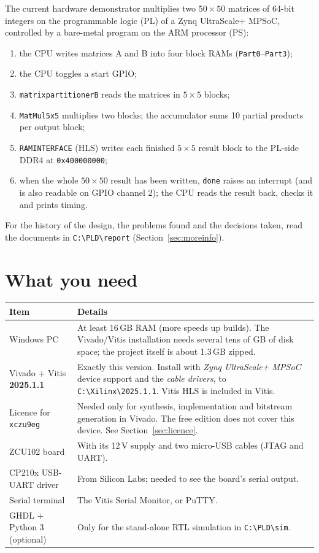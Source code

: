 \documentclass[11pt,a4paper]{article}
\newcommand{\code}[1]{\texttt{#1}}
\newcommand{\bs}{\textbackslash\allowbreak{}}
\renewcommand{\_}{\oldunderscore\allowbreak{}}
\newcommand{\pld}[1]{\code{C:\bs PLD\bs #1}}
\begin{document}
The current hardware demonstrator multiplies two $50\times50$ matrices of 64-bit integers on the programmable logic (PL) of a Zynq UltraScale+ MPSoC, controlled by a bare-metal program on the ARM processor (PS):
\begin{enumerate}[noitemsep]
  \item the CPU writes matrices A and B into four block RAMs (\code{Part0}--\code{Part3});
  \item the CPU toggles a start GPIO;
  \item \code{matrix\_partitioner\_B} reads the matrices in $5\times5$ blocks;
  \item \code{MatMul5x5} multiplies two blocks; the accumulator sums 10 partial products per output block;
  \item \code{RAM\_INTERFACE} (HLS) writes each finished $5\times5$ result block to the PL-side DDR4 at \code{0x4\_0000\_0000};
  \item when the whole $50\times50$ result has been written, \code{done} raises an interrupt (and is also readable on GPIO channel 2); the CPU reads the result back, checks it and prints timing.
\end{enumerate}

For the history of the design, the problems found and the decisions taken, read the documents in \pld{report} (Section~\ref{sec:moreinfo}).

\section{What you need}
\begin{longtable}{@{}p{}p{}@{}}
\toprule
\textbf{Item} & \textbf{Details} \\
\midrule
\endhead
Windows PC & At least 16\,GB RAM (more speeds up builds). The Vivado/Vitis installation needs several tens of GB of disk space; the project itself is about 1.3\,GB zipped. \\
Vivado + Vitis \textbf{2025.1.1} & Exactly this version. Install with \emph{Zynq UltraScale+ MPSoC} device support and the \emph{cable drivers}, to \code{C:\bs Xilinx\bs 2025.1.1}. Vitis HLS is included in Vitis. \\
Licence for \code{xczu9eg} & Needed only for synthesis, implementation and bitstream generation in Vivado. The free edition does not cover this device. See Section~\ref{sec:licence}. \\
ZCU102 board & With its 12\,V supply and two micro-USB cables (JTAG and UART). \\
CP210x USB-UART driver & From Silicon Labs; needed to see the board's serial output. \\
Serial terminal & The Vitis Serial Monitor, or PuTTY. \\
GHDL + Python 3 (optional) & Only for the stand-alone RTL simulation in \pld{sim}. \\
\bottomrule
\end{longtable}
\end{document}

